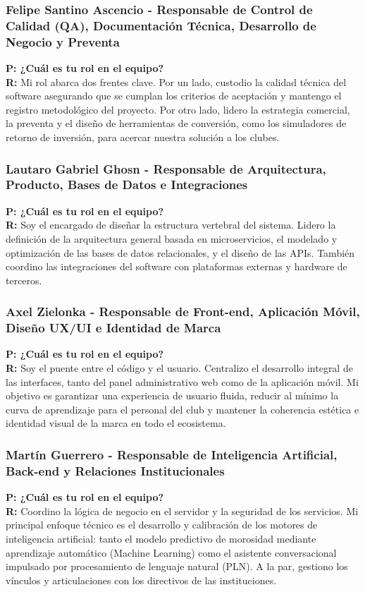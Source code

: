 \subsubsection{Felipe Santino Ascencio - Responsable de Control de Calidad (QA), Documentación Técnica, Desarrollo de Negocio y Preventa}

\textbf{P: ¿Cuál es tu rol en el equipo?} \\
\textbf{R:} Mi rol abarca dos frentes clave. Por un lado, custodio la calidad técnica del software asegurando que se cumplan los criterios de aceptación y mantengo el registro metodológico del proyecto. Por otro lado, lidero la estrategia comercial, la preventa y el diseño de herramientas de conversión, como los simuladores de retorno de inversión, para acercar nuestra solución a los clubes.

\subsubsection{Lautaro Gabriel Ghosn - Responsable de Arquitectura, Producto, Bases de Datos e Integraciones}

\textbf{P: ¿Cuál es tu rol en el equipo?} \\
\textbf{R:} Soy el encargado de diseñar la estructura vertebral del sistema. Lidero la definición de la arquitectura general basada en microservicios, el modelado y optimización de las bases de datos relacionales, y el diseño de las APIs. También coordino las integraciones del software con plataformas externas y hardware de terceros.

\subsubsection{Axel Zielonka - Responsable de Front-end, Aplicación Móvil, Diseño UX/UI e Identidad de Marca}

\textbf{P: ¿Cuál es tu rol en el equipo?} \\
\textbf{R:} Soy el puente entre el código y el usuario. Centralizo el desarrollo integral de las interfaces, tanto del panel administrativo web como de la aplicación móvil. Mi objetivo es garantizar una experiencia de usuario fluida, reducir al mínimo la curva de aprendizaje para el personal del club y mantener la coherencia estética e identidad visual de la marca en todo el ecosistema.

\subsubsection{Martín Guerrero - Responsable de Inteligencia Artificial, Back-end y Relaciones Institucionales}

\textbf{P: ¿Cuál es tu rol en el equipo?} \\
\textbf{R:} Coordino la lógica de negocio en el servidor y la seguridad de los servicios. Mi principal enfoque técnico es el desarrollo y calibración de los motores de inteligencia artificial: tanto el modelo predictivo de morosidad mediante aprendizaje automático (Machine Learning) como el asistente conversacional impulsado por procesamiento de lenguaje natural (PLN). A la par, gestiono los vínculos y articulaciones con los directivos de las instituciones.
